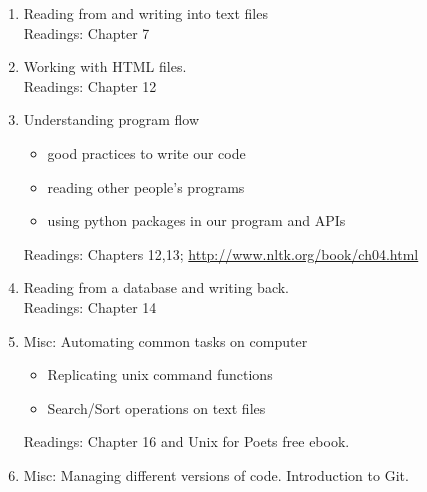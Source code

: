 \documentclass[11pt,a4paper]{article}
\begin{document}
\begin{enumerate}
\item Reading from and writing into text files
\\  Readings: Chapter 7

\item Working with HTML files. \\Readings: Chapter 12

\item Understanding program flow
\begin{itemize}
\item good practices to write our code
\item reading other people's programs
\item using python packages in our program and APIs
\end{itemize}
Readings: Chapters 12,13; \url{http://www.nltk.org/book/ch04.html}

\item Reading from a database and writing back.
\\  Readings: Chapter 14

\item Misc: Automating common tasks on computer
\begin{itemize}
\item Replicating unix command functions
\item Search/Sort operations on text files
\end{itemize}
Readings: Chapter 16 and Unix for Poets free ebook. 

\item Misc: Managing different versions of code. Introduction to Git.

\end{enumerate}
\end{document}
